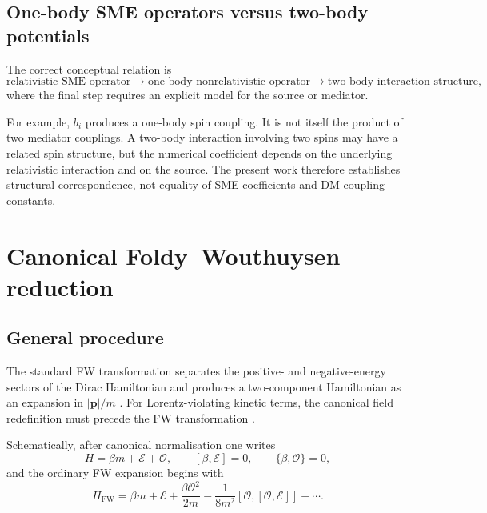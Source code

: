 \documentclass[aps,prd,reprint,superscriptaddress,nofootinbib]{revtex4-2}
\newcommand{\FW}{\mathrm{FW}}
\begin{document}
	\subsection{One-body SME operators versus two-body potentials}
	
	The correct conceptual relation is
	\begin{equation}
		\text{relativistic SME operator}
		\longrightarrow
		\text{one-body nonrelativistic operator}
		\longrightarrow
		\text{two-body interaction structure},
		\label{eq:matchingchain}
	\end{equation}
	where the final step requires an explicit model for the source or
	mediator.
	
	For example, $b_i$ produces a one-body spin coupling. It is not itself
	the product of two mediator couplings. A two-body interaction involving
	two spins may have a related spin structure, but the numerical
	coefficient depends on the underlying relativistic interaction and on
	the source. The present work therefore establishes structural
	correspondence, not equality of SME coefficients and DM coupling
	constants.
	
	\section{Canonical Foldy--Wouthuysen reduction}
	
	\subsection{General procedure}
	
	The standard FW transformation separates the positive- and
	negative-energy sectors of the Dirac Hamiltonian and produces a
	two-component Hamiltonian as an expansion in $|\mathbf p|/m$
	\cite{FoldyWouthuysen1950}. For Lorentz-violating kinetic terms, the
	canonical field redefinition must precede the FW transformation
	\cite{KosteleckyLane1999}.
	
	Schematically, after canonical normalisation one writes
	\begin{equation}
		H=\beta m+\mathcal E+\mathcal O,
		\qquad
		[\beta,\mathcal E]=0,
		\qquad
		\{\beta,\mathcal O\}=0,
	\end{equation}
	and the ordinary FW expansion begins with
	\begin{equation}
		H_{\FW}
		=
		\beta m+\mathcal E
		+\frac{\beta\mathcal O^2}{2m}
		-\frac{1}{8m^2}
		[\mathcal O,[\mathcal O,\mathcal E]]
		+\cdots .
		\label{eq:FW}
	\end{equation}
	
\end{document}
